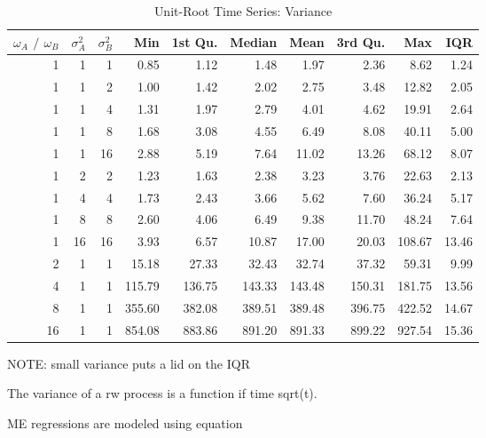 \documentclass[12pt]{article}
\begin{document}
\begin{table}
    \begin{center}
      \begin{tabular}{| r r r | r r r r r r r |}
        \hline
        $\omega_{A}$ $/$ $\omega_{B}$ & $\sigma^{2}_{A}$ & $\sigma^{2}_{B}$ & Min & 1st Qu. & Median & Mean & 3rd Qu. & Max & IQR \\
        \hline
        1  & 1  & 1  & 0.85   & 1.12   & 1.48   &  1.97  &  2.36  &  8.62  & 1.24  \\
        \hline
        1  & 1  & 2  & 1.00   & 1.42   & 2.02   &  2.75  &  3.48  & 12.82  & 2.05  \\
        1  & 1  & 4  & 1.31   & 1.97   & 2.79   &  4.01  &  4.62  & 19.91  & 2.64  \\
        1  & 1  & 8  & 1.68   & 3.08   & 4.55   &  6.49  &  8.08  & 40.11  & 5.00  \\
        1  & 1  & 16 & 2.88   & 5.19   & 7.64   & 11.02  & 13.26  & 68.12  & 8.07  \\
        \hline
        1  & 2  & 2  & 1.23   & 1.63   &  2.38  &  3.23  &  3.76  &  22.63 &  2.13  \\
        1  & 4  & 4  & 1.73   & 2.43   &  3.66  &  5.62  &  7.60  &  36.24 &  5.17  \\
        1  & 8  & 8  & 2.60   & 4.06   &  6.49  &  9.38  & 11.70  &  48.24 &  7.64  \\
        1  & 16 & 16 & 3.93   & 6.57   & 10.87  & 17.00  & 20.03  & 108.67 & 13.46  \\
        \hline
        2  & 1  & 1  &  15.18 &  27.33 &  32.43 &  32.74 &  37.32 &  59.31 &  9.99  \\
        4  & 1  & 1  & 115.79 & 136.75 & 143.33 & 143.48 & 150.31 & 181.75 & 13.56  \\
        8  & 1  & 1  & 355.60 & 382.08 & 389.51 & 389.48 & 396.75 & 422.52 & 14.67  \\
        16 & 1  & 1  & 854.08 & 883.86 & 891.20 & 891.33 & 899.22 & 927.54 & 15.36  \\
        \hline
      \end{tabular}
    \caption{Unit-Root Time Series: Variance}
    \end{center}
    \begin{tablenotes}
        \item{NOTE: small variance puts a lid on the IQR}
        \item{\footnotesize The variance of a rw process is a function if time sqrt(t).}
        \item{\footnotesize ME regressions are modeled using equation}
    \end{tablenotes}
\end{table}
\end{document}
